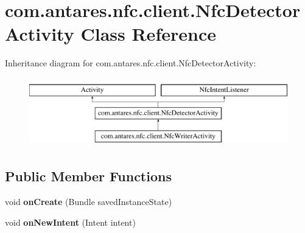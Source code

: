 \hypertarget{classcom_1_1antares_1_1nfc_1_1client_1_1_nfc_detector_activity}{\section{com.\-antares.\-nfc.\-client.\-Nfc\-Detector\-Activity Class Reference}
\label{classcom_1_1antares_1_1nfc_1_1client_1_1_nfc_detector_activity}
}
Inheritance diagram for com.\-antares.\-nfc.\-client.\-Nfc\-Detector\-Activity\-:\begin{figure}[H]
\begin{center}
\leavevmode
\includegraphics[height=3.000000cm]{classcom_1_1antares_1_1nfc_1_1client_1_1_nfc_detector_activity}
\end{center}
\end{figure}
\subsection*{Public Member Functions}
\begin{DoxyCompactItemize}
\item 
\hypertarget{classcom_1_1antares_1_1nfc_1_1client_1_1_nfc_detector_activity_af75be68d62cd34fa7edc134096aeb603}{void {\bfseries on\-Create} (Bundle saved\-Instance\-State)}\label{classcom_1_1antares_1_1nfc_1_1client_1_1_nfc_detector_activity_af75be68d62cd34fa7edc134096aeb603}

\item 
\hypertarget{classcom_1_1antares_1_1nfc_1_1client_1_1_nfc_detector_activity_a4fbe91d3c6235471e5fdc2e1973f76c6}{void {\bfseries on\-New\-Intent} (Intent intent)}\label{classcom_1_1antares_1_1nfc_1_1client_1_1_nfc_detector_activity_a4fbe91d3c6235471e5fdc2e1973f76c6}

\end{DoxyCompactItemize}
